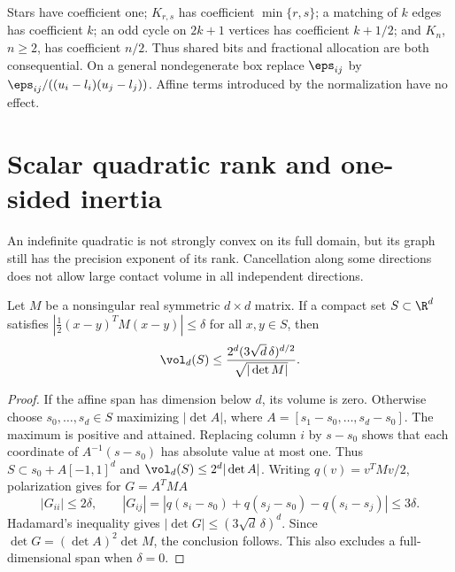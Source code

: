 Stars have coefficient one; $K_{r,s}$ has coefficient $\min\{r,s\}$;
a matching of $k$ edges has coefficient $k$; an odd cycle on $2k+1$
vertices has coefficient $k+1/2$; and $K_n$, $n\ge2$, has coefficient
$n/2$. Thus shared bits and fractional allocation are both consequential.
On a general nondegenerate box replace $\eps_{ij}$ by
$\eps_{ij}/((u_i-l_i)(u_j-l_j))$. Affine terms introduced by the
normalization have no effect.

\section{Scalar quadratic rank and one-sided inertia}\label{sec:scalar-quadratic}

An indefinite quadratic is not strongly convex on its full domain, but
its graph still has the precision exponent of its rank. Cancellation
along some directions does not allow large contact volume in all
independent directions.

\begin{lemma}\label{lem:indefinite-volume}
Let $M$ be a nonsingular real symmetric $d\times d$ matrix. If a compact
set $S\subset\R^d$ satisfies
$|\tfrac12(x-y)^TM(x-y)|\le\delta$ for all $x,y\in S$, then
\[
 \vol_d(S)\le
 \frac{2^d(3\sqrt d\,\delta)^{d/2}}{\sqrt{|\det M|}}.
\]
\end{lemma}
\begin{proof}
If the affine span has dimension below $d$, its volume is zero.
Otherwise choose $s_0,\ldots,s_d\in S$ maximizing
$|\det A|$, where $A=[s_1-s_0,\ldots,s_d-s_0]$. The maximum is
positive and attained. Replacing column $i$ by $s-s_0$ shows that each
coordinate of $A^{-1}(s-s_0)$ has absolute value at most one. Thus
$S\subset s_0+A[-1,1]^d$ and $\vol_d(S)\le2^d|\det A|$.
Writing $q(v)=v^TMv/2$, polarization gives for $G=A^TMA$
\[
 |G_{ii}|\le2\delta,\qquad
 |G_{ij}|=|q(s_i-s_0)+q(s_j-s_0)-q(s_i-s_j)|\le3\delta.
\]
Hadamard's inequality gives
$|\det G|\le(3\sqrt d\,\delta)^d$. Since
$\det G=(\det A)^2\det M$, the conclusion follows. This also excludes
a full-dimensional span when $\delta=0$.
\end{proof}

